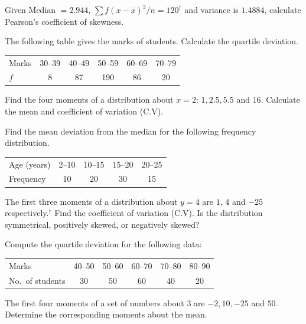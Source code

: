 \documentclass[11pt,a4paper]{article}
\begin{document}
\begin{longlist}
\item Given Median $=2.944$, $\sum f(x-\bar{x})^3/n=120^\dagger$ and variance is $1.4884$, calculate Pearson's coefficient of skewness.

\item The following table gives the marks of students. Calculate the quartile deviation.
\begin{center}
\begin{tabular}{l ccccc}
\toprule
Marks & 30--39 & 40--49 & 50--59 & 60--69 & 70--79 \\
$f$ & 8 & 87 & 190 & 86 & 20 \\
\bottomrule
\end{tabular}
\end{center}

\item Find the four moments of a distribution about $x=2$: $1, 2.5, 5.5$ and $16$. Calculate the mean and coefficient of variation (C.V).

\item Find the mean deviation from the median for the following frequency distribution.
\begin{center}
\begin{tabular}{l cccc}
\toprule
Age (years) & 2--10 & 10--15 & 15--20 & 20--25 \\
Frequency & 10 & 20 & 30 & 15 \\
\bottomrule
\end{tabular}
\end{center}

\item The first three moments of a distribution about $y=4$ are $1$, $4$ and $-25$ respectively.$^\dagger$ Find the coefficient of variation (C.V). Is the distribution symmetrical, positively skewed, or negatively skewed?

\item Compute the quartile deviation for the following data:
\begin{center}
\begin{tabular}{l ccccc}
\toprule
Marks & 40--50 & 50--60 & 60--70 & 70--80 & 80--90 \\
No.\ of students & 30 & 50 & 60 & 40 & 20 \\
\bottomrule
\end{tabular}
\end{center}

\item The first four moments of a set of numbers about $3$ are $-2, 10, -25$ and $50$. Determine the corresponding moments about the mean.


\end{longlist}
\end{document}
